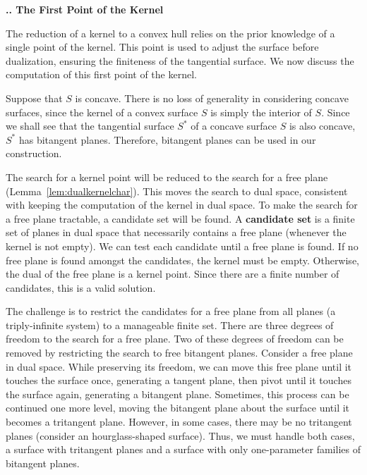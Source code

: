 \documentclass[twoside]{article}
\newcounter{sectionc}\newcounter{subsectionc}\newcounter{subsubsectionc}
\renewcommand{\subsection}[1] {\vspace{12pt}\addtocounter{subsectionc}{1} 
	\setcounter{subsubsectionc}{0}\noindent 
	{\bf\thesectionc.\thesubsectionc. {\kern1pt \bfit #1}}\par\vspace{5pt}}
\begin{document}

\subsection{The First Point of the Kernel}
\label{sec:firstpt}
\noindent
The reduction of a kernel to a convex hull relies on the prior knowledge
of a single point of the kernel.
This point is used to adjust the surface before dualization, ensuring
the finiteness of the tangential surface.
We now discuss the computation of this first point of the kernel.

Suppose that $S$ is concave.
There is no loss of generality in considering concave surfaces,
since the kernel of a convex surface $S$ is simply the interior of $S$.
Since we shall see that the tangential surface $S^*$ of
a concave surface $S$ is also concave, $S^*$ has bitangent planes.
Therefore, bitangent planes can be used in our construction. %

The search for a kernel point will be reduced to the search for a free plane
(Lemma~\ref{lem:dualkernelchar}).
This moves the search to dual space, consistent with keeping the computation
of the kernel in dual space.
To make the search for a free plane tractable, a candidate set will be found.
A {\bf candidate set} is a finite set of planes in dual space
that necessarily contains a free plane (whenever the kernel is not empty).
We can test each candidate until a free plane is found.
If no free plane is found amongst the candidates,
the kernel must be empty.
Otherwise, the dual of the free plane is a kernel point.
Since there are a finite number of candidates, this is a valid solution.

The challenge is to restrict the candidates for a free plane from
all planes (a triply-infinite system) to a manageable finite set.
There are three degrees of freedom to the search for a free plane.
Two of these degrees of freedom can be removed by restricting the search
to free bitangent planes.
Consider a free plane in dual space.
While preserving its freedom, we can move this free plane
until it touches the surface once, generating a tangent plane,
then pivot until it touches the surface again, generating a bitangent plane.
Sometimes, this process can be continued one more level,
moving the bitangent plane about the surface until it becomes a
tritangent plane.
However, in some cases, there may be no tritangent planes
(consider an hourglass-shaped surface).
Thus, we must handle both cases, a surface with tritangent planes
and a surface with only one-parameter families of bitangent planes.
\end{document}
